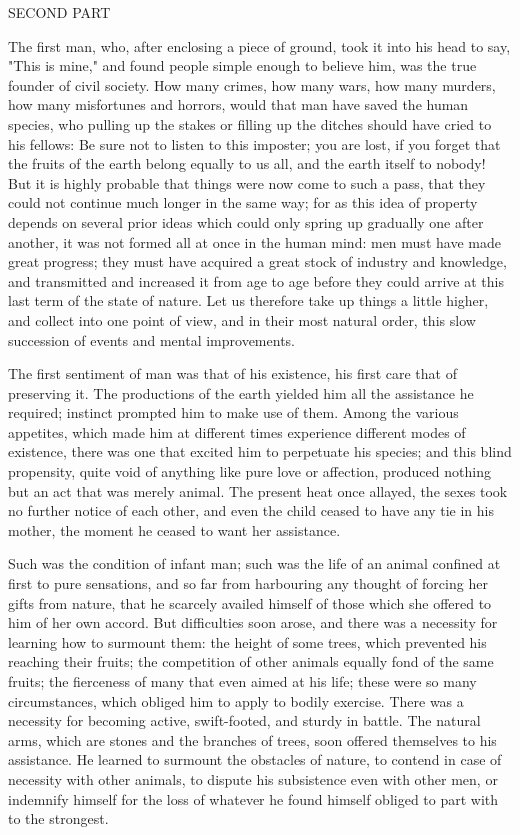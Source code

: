 \documentclass[11pt,twocolumn]{ltugboat}
\begin{document}
SECOND PART

The first man, who, after enclosing a piece of ground, took it into
his head to say, "This is mine," and found people simple enough to
believe him, was the true founder of civil society. How many crimes,
how many wars, how many murders, how many misfortunes and horrors,
would that man have saved the human species, who pulling up the stakes
or filling up the ditches should have cried to his fellows: Be sure
not to listen to this imposter; you are lost, if you forget that the
fruits of the earth belong equally to us all, and the earth itself to
nobody! But it is highly probable that things were now come to such a
pass, that they could not continue much longer in the same way; for as
this idea of property depends on several prior ideas which could only
spring up gradually one after another, it was not formed all at once
in the human mind: men must have made great progress; they must have
acquired a great stock of industry and knowledge, and transmitted and
increased it from age to age before they could arrive at this last
term of the state of nature. Let us therefore take up things a little
higher, and collect into one point of view, and in their most natural
order, this slow succession of events and mental improvements.

The first sentiment of man was that of his existence, his first care
that of preserving it. The productions of the earth yielded him all
the assistance he required; instinct prompted him to make use of them.
Among the various appetites, which made him at different times
experience different modes of existence, there was one that excited
him to perpetuate his species; and this blind propensity, quite void
of anything like pure love or affection, produced nothing but an act
that was merely animal. The present heat once allayed, the sexes took
no further notice of each other, and even the child ceased to have any
tie in his mother, the moment he ceased to want her assistance.

Such was the condition of infant man; such was the life of an animal
confined at first to pure sensations, and so far from harbouring any
thought of forcing her gifts from nature, that he scarcely availed
himself of those which she offered to him of her own accord. But
difficulties soon arose, and there was a necessity for learning how to
surmount them: the height of some trees, which prevented his reaching
their fruits; the competition of other animals equally fond of the
same fruits; the fierceness of many that even aimed at his life; these
were so many circumstances, which obliged him to apply to bodily
exercise. There was a necessity for becoming active, swift-footed, and
sturdy in battle. The natural arms, which are stones and the branches
of trees, soon offered themselves to his assistance. He learned to
surmount the obstacles of nature, to contend in case of necessity with
other animals, to dispute his subsistence even with other men, or
indemnify himself for the loss of whatever he found himself obliged to
part with to the strongest.
\end{document}
